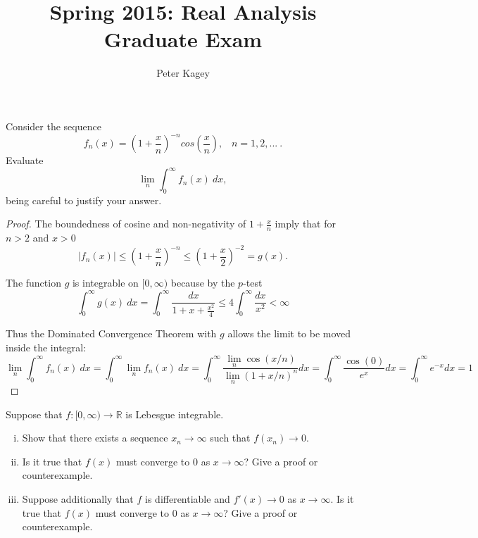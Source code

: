 \documentclass{article}
\newenvironment{problem}[2][Problem]{\begin{trivlist}
\item[\hskip \labelsep {\bfseries #1}\hskip \labelsep {\bfseries #2.}]}{\end{trivlist}}
\begin{document}
\title{Spring 2015: Real Analysis Graduate Exam}
\author{Peter Kagey}

\maketitle

\begin{problem}{1}
Consider the sequence \[
  f_n(x)=
      \left(1 + \frac{x}{n}\right)^{-n}
        cos\left(\frac{x}{n}\right),
  \hspace{10pt}
  n = 1,2,...\ .
\] Evaluate \[
  \lim_{n}\int_{0}^{\infty}f_n(x)\ dx,
\] being careful to justify your answer.
\end{problem}

\begin{proof}
The boundedness of cosine and non-negativity of $1 + \frac{x}{n}$ imply that for $n > 2$ and $x > 0$ \[
  \left|f_n(x)\right| \leq
    \left(1 + \frac{x}{n}\right)^{-n} \leq
    \left(1 + \frac{x}{2}\right)^{-2} =
    g(x).
\]

The function $g$ is integrable on $[0, \infty)$ because by the $p$-test \[
  \int_{0}^{\infty} g(x)\ dx =
    \int_{0}^{\infty} \frac{dx}{1 + x + \frac{x^2}{4}} \leq
    4\int_{0}^{\infty} \frac{dx}{x^2} <
    \infty
\]

Thus the Dominated Convergence Theorem with $g$ allows the limit to be moved inside the integral:
  \[
      \lim_{n} \int_{0}^{\infty} f_n(x)\ dx =
        \int_{0}^{\infty} \lim_{n} f_n(x)\ dx =
        \int_{0}^{\infty} \frac{
          \lim_{n} \cos\left(x/n\right)
        }{
          \lim_{n} \left(1 + x/n\right)^{n}
        } dx =
        \int_{0}^{\infty} \frac{\cos(0)}{e^x} dx =
        \int_{0}^{\infty} e^{-x} dx =
        1
    \]
\end{proof}

\pagebreak

\begin{problem}{2} Suppose that $f: [0, \infty) \rightarrow \mathbb{R}$ is Lebesgue integrable.
  \begin{enumerate}[(i)]
      \item Show that there exists a sequence $x_n \rightarrow \infty$ such that $f(x_n) \rightarrow 0$.
        \item Is it true that $f(x)$ must converge to $0$ as $x \rightarrow \infty$? Give a proof or counterexample.
        \item Suppose additionally that $f$ is differentiable and $f'(x) \rightarrow 0$ as $x \rightarrow \infty$. Is it true that $f(x)$ must converge to $0$ as $x \rightarrow \infty$? Give a proof or counterexample.
    \end{enumerate}
\end{problem}
\end{document}
